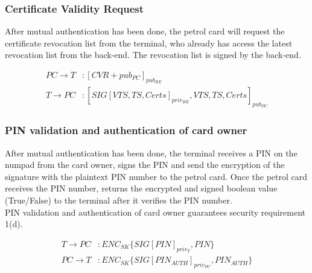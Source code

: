 \subsubsection{Certificate Validity Request}
After mutual authentication has been done, the petrol card will request the certificate revocation list from the terminal, who already has access the latest revocation list from the back-end. The revocation list is signed by the back-end. 

\begin{equation}\nonumber
\begin{split}
PC \to T &: [CVR + pub_{PC}]_{pub_{BE}}\\
T \to PC &: [SIG[VTS, TS, Certs]_{priv_{BE}}, VTS, TS, Certs]_{pub_{PC}}
\end{split} 
\end{equation}

\subsubsection{PIN validation and authentication of card owner}
After mutual authentication has been done, the terminal receives a PIN on the numpad from the card owner, signs the PIN and send the encryption of the signature with the plaintext PIN number to the petrol card. Once the petrol card receives the PIN number, returns the encrypted and signed boolean value (True/False) to the terminal after it verifies the PIN number. \\

PIN validation and authentication of card owner guarantees security requirement 1(d).

\begin{equation}\nonumber
\begin{split}
T \to PC&: ENC_{SK}\{SIG[PIN]_{priv_T}, PIN\}\\
PC \to T&: ENC_{SK}\{SIG[PIN_{AUTH}]_{priv_{PC}}, PIN_{AUTH}\}
\end{split} 
\end{equation}

